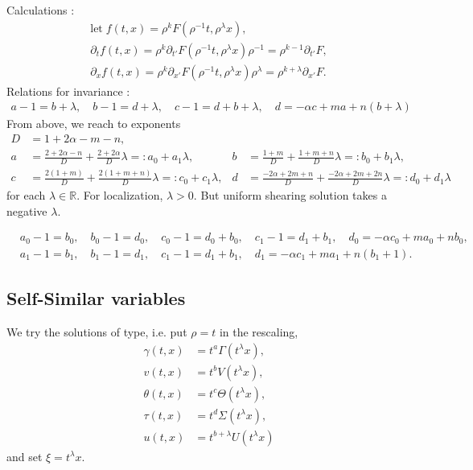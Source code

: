 \documentclass[a4paper,11pt]{article}
\begin{document}
Calculations :
\begin{align*}
 \text{let} \;f(t,x) = \rho^k F(\rho^{-1}t,\rho^\lambda x), \\
 \partial_t f(t,x) = \rho^k \partial_{t'} F(\rho^{-1}t,\rho^\lambda x) \rho^{-1} = \rho^{k-1} \partial_{t'}F, \\
 \partial_x f(t,x) = \rho^k \partial_{x'} F(\rho^{-1}t,\rho^\lambda x) \rho^\lambda = \rho^{k+\lambda} \partial_{x'}F.
\end{align*}
Relations for invariance :
\begin{align*}
 a-1 = b+\lambda, \quad b-1 = d+\lambda, \quad c-1 = d+b+\lambda, \quad d = -\alpha c + m a + n (b+\lambda)
\end{align*}
From above, we reach to exponents
\begin{align*}
 D & = 1+2\alpha-m-n,\\
 a&= \frac{2+2\alpha-n}{D} + \frac{2+2\alpha}{D}\lambda =: a_0 + a_1 \lambda, & b&=\frac{1+m}{D} + \frac{1+m+n}{D}\lambda =: b_0 + b_1\lambda,\\
 c&=\frac{2(1+m)}{D} + \frac{2(1+m+n)}{D}\lambda =: c_0 + c_1\lambda, & d&=\frac{-2\alpha + 2m +n}{D} + \frac{-2\alpha+2m+2n}{D}\lambda =: d_0 + d_1\lambda
\end{align*}
for each $\lambda \in \mathbb{R}$. For localization, $\lambda>0$. But uniform shearing solution takes a negative $\lambda$.

\begin{align*}
 &a_0-1 = b_0,  \quad b_0-1=d_0,  \quad c_0-1=d_0 +b_0, \quad c_1-1=d_1+b_1, \quad d_0 = -\alpha c_0 + ma_0 +nb_0,\\
 &a_1-1=b_1, \quad b_1-1=d_1, \quad c_1-1=d_1+b_1,  \quad d_1 = -\alpha c_1 + ma_1 +n(b_1+1).
\end{align*}


\subsection{Self-Similar variables}
We try the solutions of type, i.e. put $\rho =t$ in the rescaling,
\begin{align*}
 \gamma(t,x) &= t^a\Gamma(t^\lambda x),\\
 v(t,x) &= t^b V(t^\lambda x),\\
 \theta(t,x) &= t^c \Theta(t^\lambda x),\\
 \tau(t,x) &= t^d \Sigma(t^\lambda x),\\
 u(t,x) &= t^{b+\lambda} U(t^\lambda x)
\end{align*}
and set $\xi = t^\lambda x$.
\end{document}
